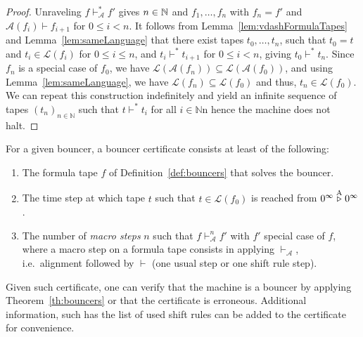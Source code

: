 \begin{proof}
    Unraveling $f \vdash_\mathcal{A}^* f'$ gives $n\in\mathbb{N}$ and $f_1, \dots, f_n$ with $f_n = f'$ and $\mathcal{A}(f_i) \vdash f_{i+1}$ for $0 \leq i < n$.
    It follows from Lemma~\ref{lem:vdashFormulaTapes} and Lemma~\ref{lem:sameLanguage} that there exist tapes $t_0, \dots, t_n$, such that $t_0 = t$ and $t_i\in \mathcal{L}(f_i)$ for $0 \leq i \leq n$, and $t_i \vdash^* t_{i+1}$ for $0 \leq i < n$, giving $t_0 \vdash^* t_n$. Since $f_n$ is a special case of $f_0$, we have $\mathcal{L}(\mathcal{A}(f_n)) \subseteq \mathcal{L}(\mathcal{A}(f_0))$, and using Lemma~\ref{lem:sameLanguage}, we have $\mathcal{L}(f_n) \subseteq \mathcal{L}(f_0)$ and thus, $t_n \in \mathcal{L}(f_0)$. We can repeat this construction indefinitely and yield an infinite sequence of tapes $(t_n)_{n\in\mathbb{N}}$ such that $t \vdash^* t_i$ for all $i\in\mathbb{N}$n hence the machine does not halt.
\end{proof}



\begin{definition}\label{def:bouncer-certificate}
    For a given bouncer, a bouncer certificate consists at least of the following:
    \begin{enumerate}
        \item The formula tape $f$ of Definition~\ref{def:bouncers} that solves the bouncer.
        \item The time step at which tape $t$ such that $t\in\mathcal{L}(f_0)$ is reached from  $0^\infty \stackrel{\text{A}}\triangleright 0^\infty$.
        \item The number of \textit{macro steps} $n$ such that $f \vdash_\mathcal{A}^n f'$ with $f'$ special case of $f$, where a macro step on a formula tape consists in applying $\vdash_\mathcal{A}$, i.e.\ alignment followed by $\vdash$ (one usual step or one shift rule step).
    \end{enumerate}
    Given such certificate, one can verify that the machine is a bouncer by applying Theorem~\ref{th:bouncers} or that the certificate is erroneous. Additional information, such has the list of used shift rules can be added to the certificate for convenience.
\end{definition}

